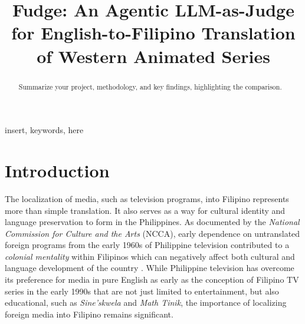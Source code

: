 \documentclass[conference]{IEEEtran}
\begin{document}
\title{Fudge: An Agentic LLM-as-Judge for English-to-Filipino Translation of Western Animated Series\\
}

\author{
\and
{}
}

\maketitle

\begin{abstract}
Summarize your project, methodology, and key findings, highlighting the comparison.
\end{abstract}

\begin{IEEEkeywords}
insert, keywords, here
\end{IEEEkeywords}

\section{Introduction}

The localization of media, such as television programs, into Filipino represents more than simple translation. It also serves as a way for cultural identity and language preservation to form in the Philippines. As documented by the \textit{National Commission for Culture and the Arts} (NCCA), early dependence on untranslated foreign programs from the early 1960s of Philippine television contributed to a \textit{colonial mentality} within Filipinos which can negatively affect both cultural and language development of the country \cite{correa_japanimation_2007,tuazon_philippine_nodate}. While Philippine television has overcome its preference for media in pure English as early as the conception of Filipino TV series in the early 1990s that are not just limited to entertainment, but also educational, such as \textit{Sine'skwela} and \textit{Math Tinik}, the importance of localizing foreign media into Filipino remains significant. 
\end{document}
